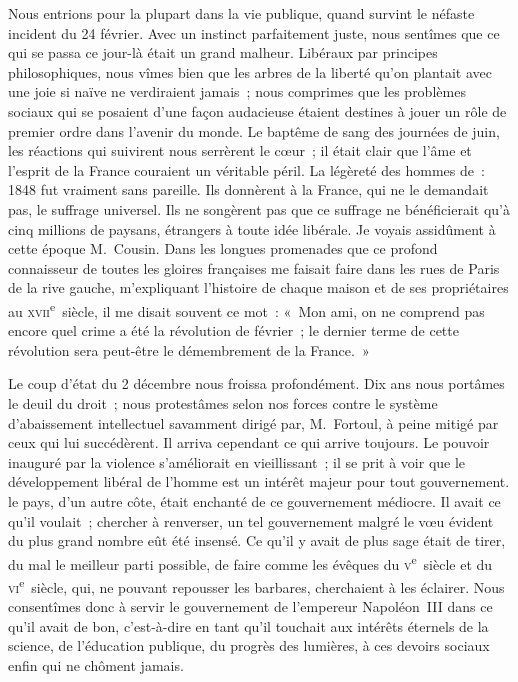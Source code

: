 \documentclass[french,twoside]{book} %
\begin{document}
Nous entrions pour la plupart dans la vie publique, quand survint le néfaste incident du 24 février. Avec un instinct parfaitement juste, nous sentîmes que ce qui se passa ce jour-là était un grand malheur. Libéraux par principes philosophiques, nous vîmes bien que les arbres de la liberté qu’on plantait avec une joie si naïve ne verdiraient jamais ; nous comprimes que les problèmes sociaux qui se posaient d’une façon audacieuse étaient destines à jouer un rôle de premier ordre dans l’avenir du monde. Le baptême de sang des journées de juin, les réactions qui suivirent nous serrèrent le cœur ; il était clair que l’âme et l’esprit de la France couraient un véritable péril. La légèreté des hommes de : 1848 fut vraiment sans pareille. Ils donnèrent à la France, qui ne le demandait pas, le suffrage universel. Ils ne songèrent pas que ce suffrage ne bénéficierait qu’à cinq millions de paysans, étrangers à toute idée libérale. Je voyais assidûment à cette époque M. Cousin. Dans les longues promenades que ce profond connaisseur de toutes les gloires françaises me faisait faire dans les rues de Paris de la rive gauche, m’expliquant l’histoire de chaque maison et de ses propriétaires au \textsc{xvii}\textsuperscript{e} siècle, il me disait souvent ce mot : « Mon ami, on ne comprend pas encore quel crime a été la révolution de février ; le dernier terme de cette révolution sera peut-être le démembrement de la France. » \par
Le coup d’état du 2 décembre nous froissa profondément. Dix ans nous portâmes le deuil du droit ; nous protestâmes selon nos forces contre le système d’abaissement intellectuel savamment dirigé par, M. Fortoul, à peine mitigé par ceux qui lui succédèrent. Il arriva cependant ce qui arrive toujours. Le pouvoir inauguré par la violence s’améliorait en vieillissant ; il se prit à voir que le développement libéral de l’homme est un intérêt majeur pour tout gouvernement. le pays, d’un autre côte, était enchanté de ce gouvernement médiocre. Il avait ce qu’il voulait ; chercher à renverser, un tel gouvernement malgré le vœu évident du plus grand nombre eût été insensé. Ce qu’il y avait de plus sage était de tirer, du mal le meilleur parti possible, de faire comme les évêques du \textsc{v}\textsuperscript{e} siècle et du \textsc{vi}\textsuperscript{e} siècle, qui, ne pouvant repousser les barbares, cherchaient à les éclairer. Nous consentîmes donc à servir le gouvernement de l’empereur Napoléon III dans ce qu’il avait de bon, c’est-à-dire en tant qu’il touchait aux intérêts éternels de la science, de l’éducation publique, du progrès des lumières, à ces devoirs sociaux enfin qui ne chôment jamais.\par
\end{document}
